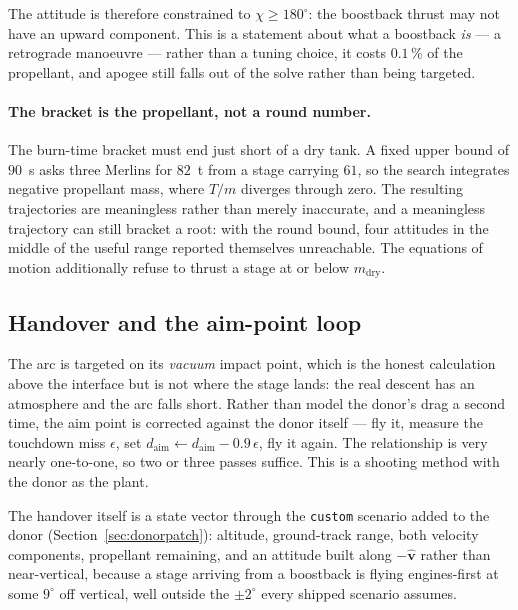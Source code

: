 \documentclass[11pt,a4paper]{article}
\newcommand{\vect}[1]{\mathbf{#1}}
\newcommand{\code}[1]{\texttt{#1}}
\begin{document}
The attitude is therefore constrained to $\chi\ge180^\circ$: the boostback
thrust may not have an upward component. This is a statement about what a
boostback \emph{is} --- a retrograde manoeuvre --- rather than a tuning choice,
it costs $0.1\,\%$ of the propellant, and apogee still falls out of the solve
rather than being targeted.

\paragraph{The bracket is the propellant, not a round number.} The burn-time
bracket must end just short of a dry tank. A fixed upper bound of $90$~s asks
three Merlins for $82$~t from a stage carrying $61$, so the search integrates
negative propellant mass, where $T/m$ diverges through zero. The resulting
trajectories are meaningless rather than merely inaccurate, and a meaningless
trajectory can still bracket a root: with the round bound, four attitudes in the
middle of the useful range reported themselves unreachable. The equations of
motion additionally refuse to thrust a stage at or below $m_{\mathrm{dry}}$.

\subsection{Handover and the aim-point loop}
\label{subsec:handover}

The arc is targeted on its \emph{vacuum} impact point, which is the honest
calculation above the interface but is not where the stage lands: the real descent has
an atmosphere and the arc falls short. Rather than model the donor's drag a
second time, the aim point is corrected against the donor itself --- fly it,
measure the touchdown miss $\epsilon$, set $d_{\mathrm{aim}} \leftarrow
d_{\mathrm{aim}} - 0.9\,\epsilon$, fly it again. The relationship is very nearly
one-to-one, so two or three passes suffice. This is a shooting method with the
donor as the plant.

The handover itself is a state vector through the \code{custom} scenario added to
the donor (Section~\ref{sec:donorpatch}): altitude, ground-track range, both
velocity components, propellant remaining, and an attitude built along
$-\hat{\vect{v}}$ rather than near-vertical, because a stage arriving from a
boostback is flying engines-first at some $9^\circ$ off vertical, well outside
the $\pm2^\circ$ every shipped scenario assumes.
\end{document}
